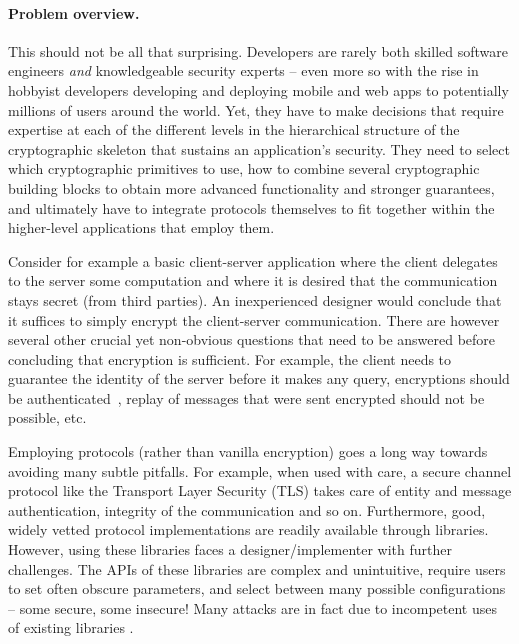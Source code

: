 \documentclass[10pt]{article}
\begin{document}
\paragraph*{Problem overview.}

This should not be all that surprising.   Developers are rarely both skilled software engineers \emph{and} knowledgeable security experts -- even more so with the rise in hobbyist developers developing and deploying mobile and web apps to potentially millions of users around the world. 
Yet, they have to make decisions that require expertise at each of the different levels in the hierarchical structure of the cryptographic skeleton that sustains an application's security.
They need to select which cryptographic primitives to use, how to combine several cryptographic building blocks to obtain more advanced functionality and stronger guarantees, and ultimately have to integrate protocols themselves to fit together within the higher-level applications that employ them.


Consider for example a basic client-server application where the client delegates to the server some computation and where it is desired that the communication stays secret (from third parties).
An inexperienced designer would conclude that it suffices to simply encrypt the client-server communication. 
There are however several other crucial yet non-obvious questions that need to be answered before concluding that  encryption is sufficient. 
For example, the client needs to guarantee the identity of the server before it makes any query, encryptions should be authenticated~\cite{BN08}, replay of messages that were sent encrypted should not be possible, etc. 

Employing protocols (rather than vanilla encryption) goes a long way towards avoiding many subtle pitfalls.  
For example, when used with care, a secure channel protocol like the Transport Layer Security (TLS) takes care of entity and message authentication, integrity of the communication and so on.  Furthermore, good, widely vetted protocol implementations are readily available through libraries.  However, using these libraries faces a designer/implementer with further challenges.   The APIs of these libraries are complex and unintuitive, require users to set often obscure parameters, and select between many possible configurations -- some secure, some insecure!  Many attacks are in fact due to incompetent uses of existing libraries  \cite{GIJABS12}. 
\end{document}
